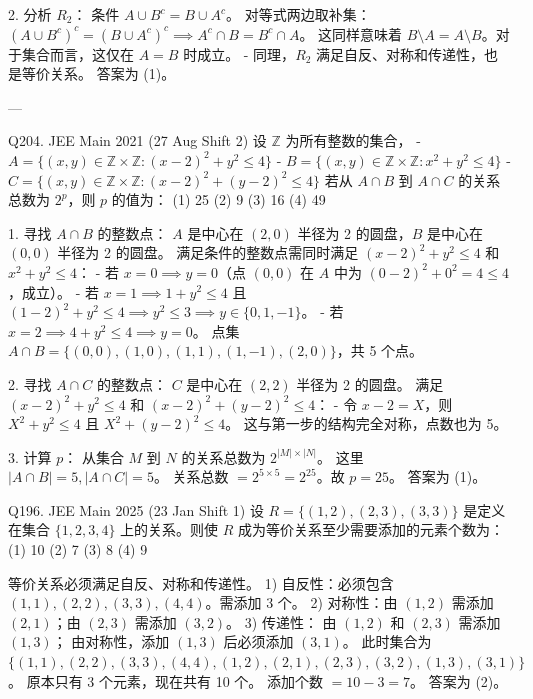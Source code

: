 \begin{questions}
\begin{solution}
2. 分析 $R_2$：
条件 $A \cup B^c = B \cup A^c$。
对等式两边取补集：$(A \cup B^c)^c = (B \cup A^c)^c \implies A^c \cap B = B^c \cap A$。
这同样意味着 $B \setminus A = A \setminus B$。对于集合而言，这仅在 $A = B$ 时成立。
- 同理，$R_2$ 满足自反、对称和传递性，也是等价关系。
答案为 (1)。
\end{solution}

---

\question
Q204. JEE Main 2021 (27 Aug Shift 2)
设 $\mathbb{Z}$ 为所有整数的集合，
- $A = \{(x, y) \in \mathbb{Z} \times \mathbb{Z} : (x - 2)^2 + y^2 \le 4\}$
- $B = \{(x, y) \in \mathbb{Z} \times \mathbb{Z} : x^2 + y^2 \le 4\}$
- $C = \{(x, y) \in \mathbb{Z} \times \mathbb{Z} : (x - 2)^2 + (y - 2)^2 \le 4\}$
若从 $A \cap B$ 到 $A \cap C$ 的关系总数为 $2^p$，则 $p$ 的值为：
(1) 25 \quad (2) 9 \quad (3) 16 \quad (4) 49

\begin{solution}
1. 寻找 $A \cap B$ 的整数点：
$A$ 是中心在 $(2, 0)$ 半径为 2 的圆盘，$B$ 是中心在 $(0, 0)$ 半径为 2 的圆盘。
满足条件的整数点需同时满足 $(x-2)^2 + y^2 \le 4$ 和 $x^2 + y^2 \le 4$：
- 若 $x=0 \implies y=0$（点 $(0,0)$ 在 $A$ 中为 $(0-2)^2+0^2=4 \le 4$，成立）。
- 若 $x=1 \implies 1+y^2 \le 4$ 且 $(1-2)^2+y^2 \le 4 \implies y^2 \le 3 \implies y \in \{0, 1, -1\}$。
- 若 $x=2 \implies 4+y^2 \le 4 \implies y=0$。
点集 $A \cap B = \{(0,0), (1,0), (1,1), (1,-1), (2,0)\}$，共 5 个点。

2. 寻找 $A \cap C$ 的整数点：
$C$ 是中心在 $(2, 2)$ 半径为 2 的圆盘。
满足 $(x-2)^2 + y^2 \le 4$ 和 $(x-2)^2 + (y-2)^2 \le 4$：
- 令 $x-2 = X$，则 $X^2 + y^2 \le 4$ 且 $X^2 + (y-2)^2 \le 4$。
这与第一步的结构完全对称，点数也为 5。

3. 计算 $p$：
从集合 $M$ 到 $N$ 的关系总数为 $2^{|M| \times |N|}$。
这里 $|A \cap B| = 5, |A \cap C| = 5$。
关系总数 $= 2^{5 \times 5} = 2^{25}$。故 $p = 25$。
答案为 (1)。
\end{solution}
\question
Q196. JEE Main 2025 (23 Jan Shift 1)
设 $R = \{(1, 2), (2, 3), (3, 3)\}$ 是定义在集合 $\{1, 2, 3, 4\}$ 上的关系。则使 $R$ 成为等价关系至少需要添加的元素个数为：
(1) 10 \quad (2) 7 \quad (3) 8 \quad (4) 9

\begin{solution}
等价关系必须满足自反、对称和传递性。
1) 自反性：必须包含 $(1, 1), (2, 2), (3, 3), (4, 4)$。需添加 3 个。
2) 对称性：由 $(1, 2)$ 需添加 $(2, 1)$；由 $(2, 3)$ 需添加 $(3, 2)$。
3) 传递性：
   由 $(1, 2)$ 和 $(2, 3)$ 需添加 $(1, 3)$；
   由对称性，添加 $(1, 3)$ 后必须添加 $(3, 1)$。
此时集合为 $\{ (1,1), (2,2), (3,3), (4,4), (1,2), (2,1), (2,3), (3,2), (1,3), (3,1) \}$。
原本只有 3 个元素，现在共有 10 个。
添加个数 $= 10 - 3 = 7$。
答案为 (2)。
\end{solution}


\end{questions}
